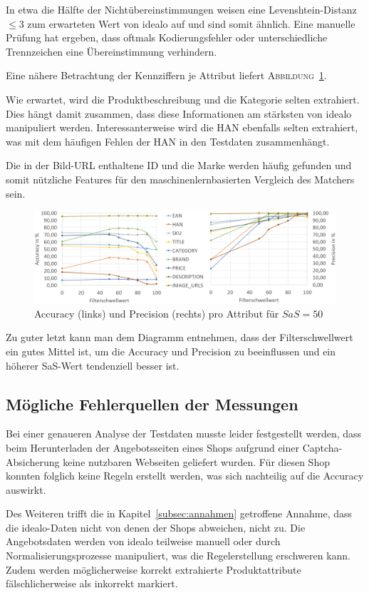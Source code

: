 In etwa die Hälfte der Nichtübereinstimmungen weisen eine Levenshtein-Distanz $\leq 3$ zum erwarteten Wert von idealo
auf und sind somit ähnlich.
Eine manuelle Prüfung hat ergeben, dass oftmals Kodierungsfehler oder unterschiedliche Trennzeichen eine
Übereinstimmung verhindern.

Eine nähere Betrachtung der Kennziffern je Attribut liefert \textsc{Abbildung}~\ref{abb:testdaten}.

Wie erwartet, wird die Produktbeschreibung und die Kategorie selten extrahiert.
Dies hängt damit zusammen, dass diese Informationen am stärksten von idealo manipuliert werden.
Interessanterweise wird die HAN ebenfalls selten extrahiert, was mit dem häufigen Fehlen der HAN in den
Testdaten zusammenhängt.

Die in der Bild-URL enthaltene ID und die Marke werden häufig gefunden und somit nützliche Features
für den maschinenlernbasierten Vergleich des Matchers sein.

\begin{figure}[H]
    \centering
    \includegraphics[width=\textwidth]{resources/accuracy-and-precision-per-attribute.PNG}
    \caption{Accuracy (links) und Precision (rechts) pro Attribut für $SaS=50$}
    \label{abb:testdaten}
\end{figure}

Zu guter letzt kann man dem Diagramm entnehmen, dass der Filterschwellwert ein gutes Mittel ist, um die Accuracy und
Precision zu beeinflussen und ein höherer SaS-Wert tendenziell besser ist.

\subsection{Mögliche Fehlerquellen der Messungen}
\label{subsec:fehlerquellen}

Bei einer genaueren Analyse der Testdaten musste leider festgestellt werden, dass beim Herunterladen der
Angebotsseiten eines Shops aufgrund einer Captcha-Absicherung keine nutzbaren Webseiten geliefert wurden.
Für diesen Shop konnten folglich keine Regeln erstellt werden, was sich nachteilig auf die Accuracy auswirkt.

Des Weiteren trifft die in Kapitel~\ref{subsec:annahmen} getroffene Annahme, dass die idealo-Daten nicht von denen der
Shops abweichen, nicht zu.
Die Angebotsdaten werden von idealo teilweise manuell oder durch Normalisierungsprozesse manipuliert, was die
Regelerstellung erschweren kann.
Zudem werden möglicherweise korrekt extrahierte Produktattribute fälschlicherweise als inkorrekt markiert.